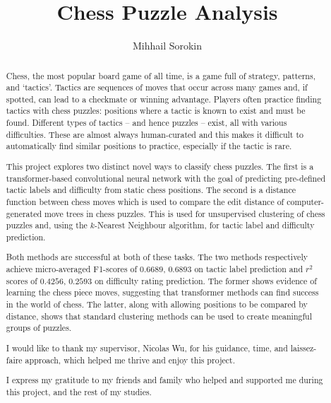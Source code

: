 \documentclass[a4paper, twoside]{report}
\title{Chess Puzzle Analysis}
\author{Mihhail Sorokin}
\begin{document}



\begin{abstract}

  Chess, the most popular board game of all time, is a game full of strategy,
  patterns, and `tactics'. Tactics are sequences of moves that occur across
  many games and, if spotted, can lead to a checkmate or winning advantage.
  Players often practice finding tactics with chess puzzles: positions where a
  tactic is known to exist and must be found. Different types of tactics -- and
  hence puzzles -- exist, all with various difficulties. These are almost
  always human-curated and this makes it difficult to automatically find
  similar positions to practice, especially if the tactic is rare.

  This project explores two distinct novel ways to classify chess puzzles. The
  first is a transformer-based convolutional neural network with the goal of
  predicting pre-defined tactic labels and difficulty from static chess
  positions. The second is a distance function between chess moves which is
  used to compare the edit distance of computer-generated move trees in chess
  puzzles. This is used for unsupervised clustering of chess puzzles and, using
  the $k$-Nearest Neighbour algorithm, for tactic label and difficulty
  prediction.

  Both methods are successful at both of these tasks. The two methods
  respectively achieve micro-averaged F1-scores of $0.6689$, $0.6893$ on tactic
  label prediction and $r^2$ scores of $0.4256$, $0.2593$ on difficulty rating
  prediction. The former shows evidence of learning the chess piece moves,
  suggesting that transformer methods can find success in the world of chess.
  The latter, along with allowing positions to be compared by distance, shows
  that standard clustering methods can be used to create meaningful groups of
  puzzles.

\end{abstract}

\renewcommand{\abstractname}{Acknowledgements}
\begin{abstract}

  I would like to thank my supervisor, Nicolas Wu, for his guidance, time, and
  laissez-faire approach, which helped me thrive and enjoy this project.

  I express my gratitude to my friends and family who helped and supported
  me during this project, and the rest of my studies. 

\end{abstract}
\end{document}
